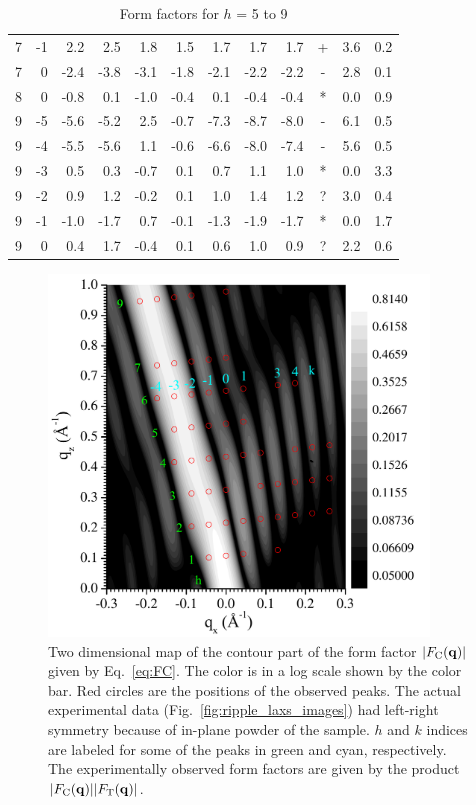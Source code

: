 \begin{table}[htbp]
\begin{tabular}{rrrrrrrrrcrr}
7 & -1 & 2.2 & 2.5 & 1.8 & 1.5 & 1.7 & 1.7 & 1.7 & + & 3.6 & 0.2 \\ 
7 & 0 & -2.4 & -3.8 & -3.1 & -1.8 & -2.1 & -2.2 & -2.2 & - & 2.8 & 0.1 \\ 
8 & 0 & -0.8 & 0.1 & -1.0 & -0.4 & 0.1 & -0.4 & -0.4 & * & 0.0 & 0.9 \\ 
9 & -5 & -5.6 & -5.2 & 2.5 & -0.7 & -7.3 & -8.7 & -8.0 & - & 6.1 & 0.5 \\ 
9 & -4 & -5.5 & -5.6 & 1.1 & -0.6 & -6.6 & -8.0 & -7.4 & - & 5.6 & 0.5 \\ 
9 & -3 & 0.5 & 0.3 & -0.7 & 0.1 & 0.7 & 1.1 & 1.0 & * & 0.0 & 3.3 \\ 
9 & -2 & 0.9 & 1.2 & -0.2 & 0.1 & 1.0 & 1.4 & 1.2 & ? & 3.0 & 0.4 \\ 
9 & -1 & -1.0 & -1.7 & 0.7 & -0.1 & -1.3 & -1.9 & -1.7 & * & 0.0 & 1.7 \\ 
9 & 0 & 0.4 & 1.7 & -0.4 & 0.1 & 0.6 & 1.0 & 0.9 & ? & 2.2 & 0.6 \\ 
\hline
\end{tabular}
\caption{Form factors for $h$ = 5 to 9}
\label{tab:LAXS_fits2}
\end{table}

\begin{figure}[htbp]
  \centering
  \includegraphics[width=0.9\textwidth]{figures/ripple/model/FT}
  \caption[Two dimensional map of $\FC$]
  {Two dimensional map of the contour part of the form factor $|F_\mathrm{C}(\mathbf{q})|$ given by
  Eq.~\ref{eq:FC}. The color is in a log scale shown by the color bar.
  Red circles are the positions of the observed peaks. The actual
  experimental data (Fig.~\ref{fig:ripple_laxs_images}) had left-right symmetry 
  because of in-plane powder of the sample.
  $h$ and $k$ indices are labeled for some of the peaks in green and cyan,
  respectively. The experimentally observed form factors are given by 
  the product $|F_\mathrm{C}(\mathbf{q})||F_\mathrm{T}(\mathbf{q})|$.}
  \label{fig:FC}
\end{figure}

